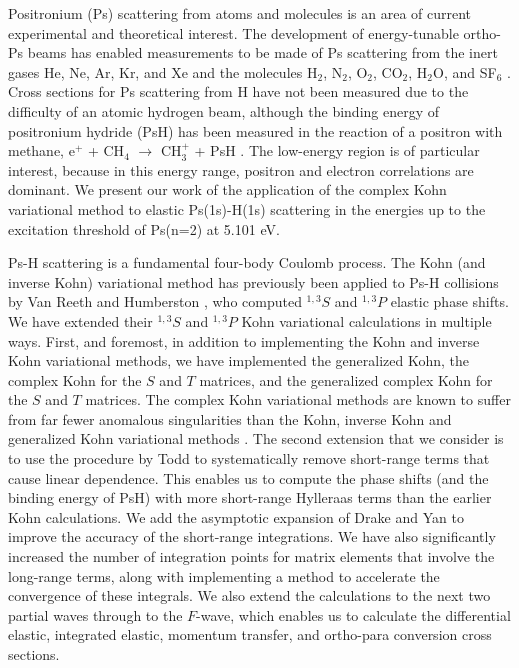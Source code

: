 \documentclass[preprint,showpacs,showkeys,preprintnumbers,amsmath,amssymb,longbibliography,pra,aps]{revtex4-1}
\begin{document}
Positronium (Ps) scattering from atoms and molecules is an area of current 
experimental and theoretical interest. The development of energy-tunable
ortho-Ps beams
\cite{Brown1985,Laricchia1987,Zafar1996,Garner1996,Laricchia2008} 
has enabled measurements to be made of Ps scattering from the inert gases He,
Ne, Ar, Kr, and Xe
\cite{Garner1996,Garner2000,Armitage2002,Laricchia2004,Armitage2006,Laricchia2008,Engbrecht2008,Brawley2010a}
and the molecules H$_2$, N$_2$, O$_2$, CO$_2$, H$_2$O, and SF$_6$
\cite{Garner1996,Garner1998,Garner2000,Laricchia2004,Armitage2006,Beale2006,Brawley2010a}.
Cross sections for Ps scattering from H have not been measured due to the
difficulty of an atomic hydrogen beam, although the binding energy of positronium
hydride (PsH) has been measured in the reaction of a positron with methane,
e$^+$ + CH$_4$ $\to$ CH$_3^+$ + PsH \cite{Schrader1992}. The low-energy region
is of particular interest, because in this energy range, positron and electron 
correlations are dominant. We present
\cite{Conferences1,Conferences2,Conferences3,WoodsDiss2015} 
our work of the application of the complex Kohn variational 
method to elastic Ps(1s)-H(1s) scattering in the energies up to the 
excitation threshold of Ps(n=2) at 5.101 eV.

Ps-H scattering is a fundamental four-body Coulomb process. The Kohn (and 
inverse Kohn) variational method has previously been applied to Ps-H 
collisions by Van Reeth and Humberston \cite{VanReeth2003,VanReeth2004}, who 
computed $^{1,3}S$ and $^{1,3}P$ elastic phase shifts. We 
have extended their $^{1,3}S$ and $^{1,3}P$ Kohn variational calculations in 
multiple ways. First, and foremost, in addition to implementing
the Kohn and inverse Kohn variational methods, we have implemented the 
generalized Kohn, the complex Kohn for the $S$ and $T$ matrices, and the
generalized complex Kohn for the $S$ and $T$
matrices. The complex Kohn variational methods are known to suffer
from far fewer anomalous singularities than the Kohn, inverse Kohn and 
generalized Kohn variational methods
\cite{Lucchese1989, Cooper2009, Cooper2010}. The second extension that we
consider is to use the procedure by Todd 
\cite{Todd2007} to systematically remove short-range terms that cause linear 
dependence. This enables us to compute the phase shifts (and the binding 
energy of PsH) with more short-range Hylleraas terms than the earlier 
Kohn calculations. We add the asymptotic expansion of Drake and Yan
\cite{Drake1995, Yan1997} to improve the accuracy of the short-range
integrations. We have also significantly increased the number of integration
points for matrix
elements that involve the long-range terms, along with implementing a method to
accelerate the convergence of these integrals. We also extend the 
calculations to the next two partial waves through to the $F$-wave, which
enables us to calculate the differential elastic, integrated elastic, momentum
transfer, and ortho-para conversion cross sections.
\end{document}
